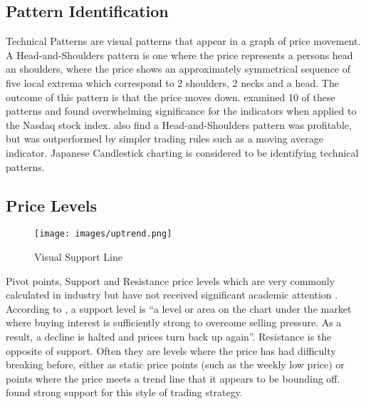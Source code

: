 \documentclass{article}
\theoremstyle{definition}
\begin{document}
\subsection{Pattern Identification}
Technical Patterns are visual patterns that appear in a graph of price movement. A Head-and-Shoulders pattern is one where the price represents a persons head an shoulders, where the price shows an approximately symmetrical sequence of five local extrema which correspond to 2 shoulders, 2 necks and a head. The outcome of this pattern is that the price moves down. \cite{foundations} examined 10 of these patterns and found overwhelming significance for the indicators when applied to the Nasdaq stock index. \cite{chang1999methodical} also find a Head-and-Shoulders pattern was profitable, but was outperformed by simpler trading rules such as a moving average indicator. Japanese Candlestick charting is considered to be identifying technical patterns.

\subsection{Price Levels}

\begin{figure}[H]
    \centering
    \texttt{[image: images/uptrend.png]}
    \caption{Visual Support Line}
\end{figure}

Pivot points, Support and Resistance price levels which are very commonly calculated in industry but have not received significant academic attention \citep[p. 55]{osler2000support}. According to \cite{murphy1999technical}, a support level is ``a level or area on the chart under the market where buying interest is sufficiently strong to overcome selling pressure. As a result, a decline is halted and prices turn back up again''. Resistance is the opposite of support. Often they are levels where the price has had difficulty breaking before, either as static price points (such as the weekly low price) or points where the price meets a trend line that it appears to be bounding off. \cite{brock1992} found strong support for this style of trading strategy.




\end{document}
